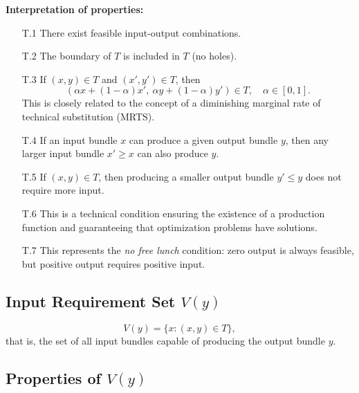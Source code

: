 \medskip

\textbf{Interpretation of properties:}

\begin{itemize}
    \item[T.1] There exist feasible input-output combinations.
    
    \item[T.2] The boundary of $T$ is included in $T$ (no holes).
    
    \item[T.3] If $(x,y) \in T$ and $(x',y') \in T$, then
    \[
    (\alpha x + (1-\alpha)x',\ \alpha y + (1-\alpha)y') \in T,
    \quad \alpha \in [0,1].
    \]
    This is closely related to the concept of a diminishing marginal
    rate of technical substitution (MRTS).

    \item[T.4] If an input bundle $x$ can produce a given output bundle $y$,
    then any larger input bundle $x' \ge x$ can also produce $y$.

    \item[T.5] If $(x,y) \in T$, then producing a smaller output bundle
    $y' \le y$ does not require more input.

    \item[T.6] This is a technical condition ensuring the existence of
    a production function and guaranteeing that optimization problems
    have solutions.

    \item[T.7] This represents the \textit{no free lunch} condition:
    zero output is always feasible, but positive output requires
    positive input.
\end{itemize}

\subsection{Input Requirement Set $V(y)$}

\[
V(y)
=
\{x : (x,y) \in T\},
\]
that is, the set of all input bundles capable of producing
the output bundle $y$.

\subsection*{Properties of $V(y)$}

